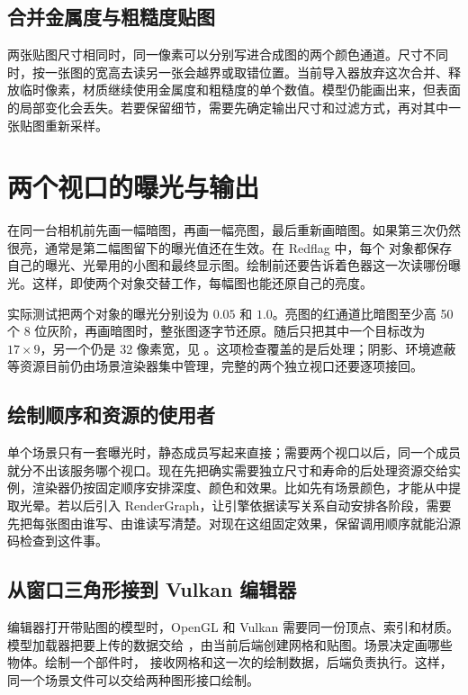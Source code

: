 \subsection{合并金属度与粗糙度贴图}
两张贴图尺寸相同时，同一像素可以分别写进合成图的两个颜色通道。尺寸不同时，按一张图的宽高去读另一张会越界或取错位置。当前导入器放弃这次合并、释放临时像素，材质继续使用金属度和粗糙度的单个数值。模型仍能画出来，但表面的局部变化会丢失。若要保留细节，需要先确定输出尺寸和过滤方式，再对其中一张贴图重新采样。

\newpage
\section{两个视口的曝光与输出}
在同一台相机前先画一幅暗图，再画一幅亮图，最后重新画暗图。如果第三次仍然很亮，通常是第二幅图留下的曝光值还在生效。在 Redflag 中，每个  对象都保存自己的曝光、光晕用的小图和最终显示图。绘制前还要告诉着色器这一次读哪份曝光。这样，即使两个对象交替工作，每幅图也能还原自己的亮度。

实际测试把两个对象的曝光分别设为 $0.05$ 和 $1.0$。亮图的红通道比暗图至少高 50 个 8 位灰阶，再画暗图时，整张图逐字节还原。随后只把其中一个目标改为 $17\times9$，另一个仍是 32 像素宽，见 。这项检查覆盖的是后处理；阴影、环境遮蔽等资源目前仍由场景渲染器集中管理，完整的两个独立视口还要逐项接回。

\subsection{绘制顺序和资源的使用者}
单个场景只有一套曝光时，静态成员写起来直接；需要两个视口以后，同一个成员就分不出该服务哪个视口。现在先把确实需要独立尺寸和寿命的后处理资源交给实例，渲染器仍按固定顺序安排深度、颜色和效果。比如先有场景颜色，才能从中提取光晕。若以后引入 RenderGraph，让引擎依据读写关系自动安排各阶段，需要先把每张图由谁写、由谁读写清楚。对现在这组固定效果，保留调用顺序就能沿源码检查到这件事。

\subsection{从窗口三角形接到 Vulkan 编辑器}
编辑器打开带贴图的模型时，OpenGL 和 Vulkan 需要同一份顶点、索引和材质。模型加载器把要上传的数据交给 ，由当前后端创建网格和贴图。场景决定画哪些物体。绘制一个部件时， 接收网格和这一次的绘制数据，后端负责执行。这样，同一个场景文件可以交给两种图形接口绘制。

